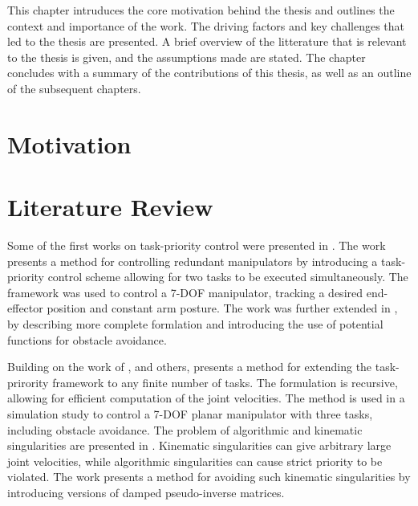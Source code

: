 This chapter intruduces the core motivation behind the thesis and outlines the
context and importance of the work. The driving factors and key challenges that
led to the thesis are presented. A brief overview of the litterature that is
relevant to the thesis is given, and the assumptions made are
stated. The chapter concludes with a summary of the contributions of this thesis,
as well as an outline of the subsequent chapters.


\section{Motivation}

\newpage
\section{Literature Review}

\iffalse
Some of the first works on task-priority control were presented in
\cite{hanafusa1981}. The work presents a method for controlling redundant
manipulators by introducing a task-priority control scheme allowing for two
tasks to be executed simultaneously. The framework was used to control a 7-DOF
manipulator, tracking a desired end-effector position and constant arm posture.
The work was further extended in \cite{nakamura1987}, by describing more complete
formlation and introducing the use of potential functions for obstacle avoidance.

Building on the work of \cite{hanafusa1981}, \cite{nakamura1987} and others,
\cite{siciliano1991} presents a method for extending the task-prirority framework
to any finite number of tasks. The formulation is recursive, allowing for efficient
computation of the joint velocities. The method is used in a simulation study 
to control a 7-DOF planar manipulator with three tasks, including obstacle avoidance.
The problem of algorithmic and kinematic singularities are presented in \cite{chiaverini1997}.
Kinematic singularities can give arbitrary large joint velocities, while algorithmic
singularities can cause strict priority to be violated. The work presents a method
for avoiding such kinematic singularities by introducing versions of damped pseudo-inverse
matrices.

